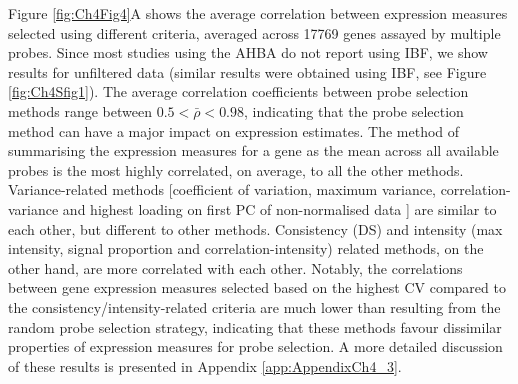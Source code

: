 Figure \ref{fig:Ch4Fig4}A shows the average correlation between expression measures selected using different criteria, averaged across \num{17769} genes assayed by multiple probes. Since most studies using the AHBA do not report using IBF, we show results for unfiltered data (similar results were obtained using IBF, see Figure \ref{fig:Ch4Sfig1}). The average correlation coefficients between probe selection methods range between $0.5 < \bar{\rho} < 0.98$, indicating that the probe selection method can have a major impact on expression estimates. The method of summarising the expression measures for a gene as the mean across all available probes is the most highly correlated, on average, to all the other methods. Variance-related methods [coefficient of variation, maximum variance, correlation-variance and highest loading on first PC of non-normalised data \citep{Parkes2017}] are similar to each other, but different to other methods. Consistency (DS) and intensity (max intensity, signal proportion and correlation-intensity) related methods, on the other hand, are more correlated with each other. Notably, the correlations between gene expression measures selected based on the highest CV compared to the consistency/intensity-related criteria are much lower than resulting from the random probe selection strategy, indicating that these methods favour dissimilar properties of expression measures for probe selection. A more detailed discussion of these results is presented in Appendix \ref{app:AppendixCh4_3}.

